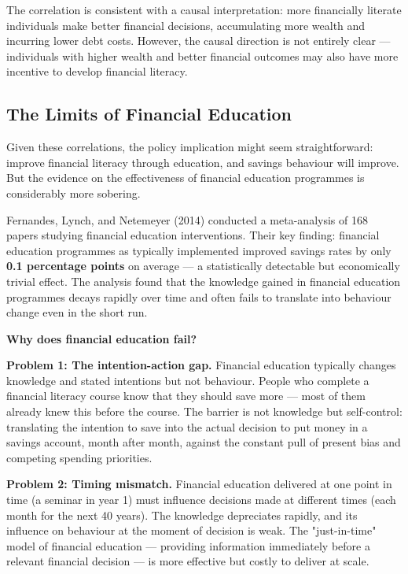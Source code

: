 \documentclass[12pt, letterpaper]{article}
\begin{document}
The correlation is consistent with a causal interpretation: more financially literate individuals make better financial decisions, accumulating more wealth and incurring lower debt costs. However, the causal direction is not entirely clear --- individuals with higher wealth and better financial outcomes may also have more incentive to develop financial literacy.


\subsection{The Limits of Financial Education}


Given these correlations, the policy implication might seem straightforward: improve financial literacy through education, and savings behaviour will improve. But the evidence on the effectiveness of financial education programmes is considerably more sobering.

Fernandes, Lynch, and Netemeyer (2014) conducted a meta-analysis of 168 papers studying financial education interventions. Their key finding: financial education programmes as typically implemented improved savings rates by only \textbf{0.1 percentage points} on average --- a statistically detectable but economically trivial effect. The analysis found that the knowledge gained in financial education programmes decays rapidly over time and often fails to translate into behaviour change even in the short run.

\textbf{Why does financial education fail?}

\textbf{Problem 1: The intention-action gap.} Financial education typically changes knowledge and stated intentions but not behaviour. People who complete a financial literacy course know that they should save more --- most of them already knew this before the course. The barrier is not knowledge but self-control: translating the intention to save into the actual decision to put money in a savings account, month after month, against the constant pull of present bias and competing spending priorities.

\textbf{Problem 2: Timing mismatch.} Financial education delivered at one point in time (a seminar in year 1) must influence decisions made at different times (each month for the next 40 years). The knowledge depreciates rapidly, and its influence on behaviour at the moment of decision is weak. The "just-in-time" model of financial education --- providing information immediately before a relevant financial decision --- is more effective but costly to deliver at scale.
\end{document}
